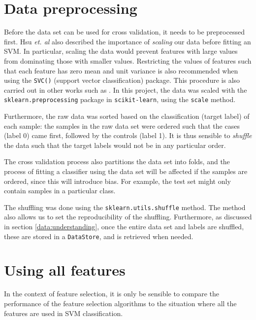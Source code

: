 \documentclass[12pt, twoside, a4paper]{report}
\begin{document}
\section{Data preprocessing}

Before the data set can be used for cross validation, it needs to be preprocessed first. Hsu \textit{et. al} also described the importance of \textit{scaling} our data before fitting an SVM. In particular, scaling the data would prevent features with large values from dominating those with smaller values. Restricting the values of features such that each feature has zero mean and unit variance is also recommended when using the \texttt{SVC()} (support vector classification) package. This procedure is also carried out in other works such as \cite{RefWorks:228}. In this project, the data was scaled with the \texttt{sklearn.preprocessing} package in \texttt{scikit-learn}, using the \texttt{scale} method.

Furthermore, the raw data was sorted based on the classification (target label) of each sample: the samples in the raw data set were ordered such that the cases (label 0) came first, followed by the controls (label 1). It is thus sensible to \textit{shuffle} the data such that the target labels would not be in any particular order.

The cross validation process also partitions the data set into folds, and the process of fitting a classifier using the data set will be affected if the samples are ordered, since this will introduce bias. For example, the test set might only contain samples in a particular class.

The shuffling was done using the \texttt{sklearn.utils.shuffle} method. The method also allows us to set the reproducibility of the shuffling. Furthermore, as discussed in section \ref{data:understanding}, once the entire data set and labels are shuffled, these are stored in a \texttt{DataStore}, and is retrieved when needed.



\section{Using all features} \label{data:all_features}

In the context of feature selection, it is only be sensible to compare the performance of the feature selection algorithms to the situation where all the features are used in SVM classification.
\end{document}
